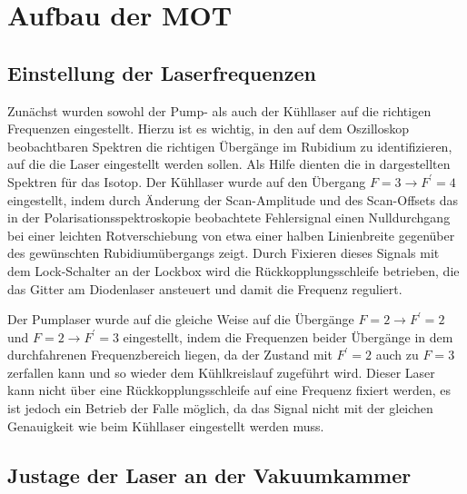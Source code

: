 \documentclass[11pt, a4paper]{article}
\numberwithin{equation}{section}
\begin{document}
\section{Aufbau der MOT}

\subsection{Einstellung der Laserfrequenzen}

Zunächst wurden sowohl der Pump- als auch der Kühllaser auf die richtigen Frequenzen eingestellt.
Hierzu ist es wichtig, in den auf dem Oszilloskop beobachtbaren Spektren die richtigen Übergänge im Rubidium zu identifizieren, auf die die Laser eingestellt werden sollen.
Als Hilfe dienten die in \cite{anleitung} dargestellten Spektren für das  Isotop.
Der Kühllaser wurde auf den Übergang $F=3 \rightarrow F^\prime=4$ eingestellt, indem durch Änderung der Scan-Amplitude und des Scan-Offsets das in der Polarisationsspektroskopie beobachtete Fehlersignal einen Nulldurchgang bei einer leichten Rotverschiebung von etwa einer halben Linienbreite gegenüber des gewünschten Rubidiumübergangs zeigt.
Durch Fixieren dieses Signals mit dem Lock-Schalter an der Lockbox wird die Rückkopplungsschleife betrieben, die das Gitter am Diodenlaser ansteuert und damit die Frequenz reguliert.

Der Pumplaser wurde auf die gleiche Weise auf die Übergänge $F=2 \rightarrow F^\prime=2$ und $F=2 \rightarrow F^\prime = 3$ eingestellt, indem die Frequenzen beider Übergänge in dem durchfahrenen Frequenzbereich liegen, da der Zustand mit $F^\prime = 2$ auch zu $F=3$ zerfallen kann und so wieder dem Kühlkreislauf zugeführt wird.
Dieser Laser kann nicht über eine Rückkopplungsschleife auf eine Frequenz fixiert werden, es ist jedoch ein Betrieb der Falle  möglich, da das Signal nicht mit der gleichen Genauigkeit wie beim Kühllaser eingestellt werden muss.

\subsection{Justage der Laser an der Vakuumkammer}
\end{document}
